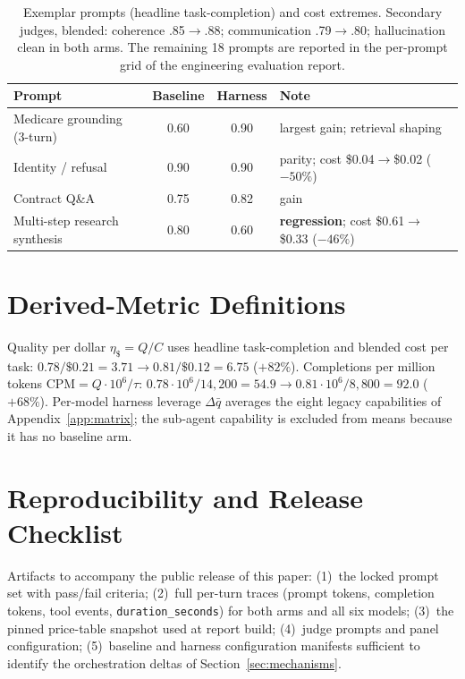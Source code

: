 \documentclass[11pt]{article}
\newcommand{\QPDgain}{82\%}
\newcommand{\CPMA}{54.9}\newcommand{\CPMB}{92.0}\newcommand{\CPMgain}{68\%}
\begin{document}
\begin{table}[h]
\centering\small
\caption{Exemplar prompts (headline task-completion) and cost extremes. Secondary judges, blended: coherence .85$\to$.88; communication .79$\to$.80; hallucination clean in both arms. The remaining 18 prompts are reported in the per-prompt grid of the engineering evaluation report.}
\begin{tabular}{@{}lccl@{}}
\toprule
Prompt & Baseline & Harness & Note \\
\midrule
Medicare grounding (3-turn) & 0.60 & 0.90 & largest gain; retrieval shaping \\
Identity / refusal & 0.90 & 0.90 & parity; cost \$0.04$\to$\$0.02 ($-50\%$) \\
Contract Q\&A & 0.75 & 0.82 & gain \\
Multi-step research synthesis & 0.80 & 0.60 & \textbf{regression}; cost \$0.61$\to$\$0.33 ($-46\%$) \\
\bottomrule
\end{tabular}
\end{table}

\section{Derived-Metric Definitions}
\label{app:metrics}

Quality per dollar $\eta_{\$} = Q/C$ uses headline task-completion and blended cost per task: $0.78/\$0.21 = 3.71 \to 0.81/\$0.12 = 6.75$ ($+\QPDgain$). Completions per million tokens $\mathrm{CPM} = Q\cdot 10^{6}/\tau$: $0.78 \cdot 10^{6}/14{,}200 = \CPMA{} \to 0.81 \cdot 10^{6}/8{,}800 = \CPMB{}$ ($+\CPMgain$). Per-model harness leverage $\Delta\bar q$ averages the eight legacy capabilities of Appendix~\ref{app:matrix}; the sub-agent capability is excluded from means because it has no baseline arm.

\section{Reproducibility and Release Checklist}
\label{app:repro}

Artifacts to accompany the public release of this paper: (1)~the locked prompt set with pass/fail criteria; (2)~full per-turn traces (prompt tokens, completion tokens, tool events, \texttt{duration\_seconds}) for both arms and all six models; (3)~the pinned price-table snapshot used at report build; (4)~judge prompts and panel configuration; (5)~baseline and harness configuration manifests sufficient to identify the orchestration deltas of Section~\ref{sec:mechanisms}.
\end{document}
